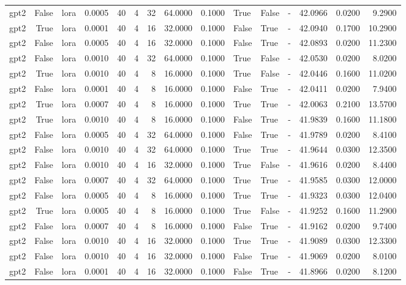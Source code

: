 \begin{tabular}{lrlrrrrrrlllrrr}
gpt2 & False & lora & 0.0005 & 40 & 4 & 32 & 64.0000 & 0.1000 & True & False & - & 42.0966 & 0.0200 & 9.2900 \\
gpt2 & True & lora & 0.0001 & 40 & 4 & 16 & 32.0000 & 0.1000 & False & True & - & 42.0940 & 0.1700 & 10.2900 \\
gpt2 & False & lora & 0.0005 & 40 & 4 & 16 & 32.0000 & 0.1000 & False & True & - & 42.0893 & 0.0200 & 11.2300 \\
gpt2 & False & lora & 0.0010 & 40 & 4 & 32 & 64.0000 & 0.1000 & True & False & - & 42.0530 & 0.0200 & 8.0200 \\
gpt2 & True & lora & 0.0010 & 40 & 4 & 8 & 16.0000 & 0.1000 & True & False & - & 42.0446 & 0.1600 & 11.0200 \\
gpt2 & False & lora & 0.0001 & 40 & 4 & 8 & 16.0000 & 0.1000 & False & True & - & 42.0411 & 0.0200 & 7.9400 \\
gpt2 & True & lora & 0.0007 & 40 & 4 & 8 & 16.0000 & 0.1000 & True & True & - & 42.0063 & 0.2100 & 13.5700 \\
gpt2 & True & lora & 0.0010 & 40 & 4 & 8 & 16.0000 & 0.1000 & False & True & - & 41.9839 & 0.1600 & 11.1800 \\
gpt2 & False & lora & 0.0005 & 40 & 4 & 32 & 64.0000 & 0.1000 & False & True & - & 41.9789 & 0.0200 & 8.4100 \\
gpt2 & False & lora & 0.0010 & 40 & 4 & 32 & 64.0000 & 0.1000 & True & True & - & 41.9644 & 0.0300 & 12.3500 \\
gpt2 & False & lora & 0.0010 & 40 & 4 & 16 & 32.0000 & 0.1000 & True & False & - & 41.9616 & 0.0200 & 8.4400 \\
gpt2 & False & lora & 0.0007 & 40 & 4 & 32 & 64.0000 & 0.1000 & True & True & - & 41.9585 & 0.0300 & 12.0000 \\
gpt2 & False & lora & 0.0005 & 40 & 4 & 8 & 16.0000 & 0.1000 & True & True & - & 41.9323 & 0.0300 & 12.0400 \\
gpt2 & True & lora & 0.0005 & 40 & 4 & 8 & 16.0000 & 0.1000 & True & False & - & 41.9252 & 0.1600 & 11.2900 \\
gpt2 & False & lora & 0.0007 & 40 & 4 & 8 & 16.0000 & 0.1000 & False & True & - & 41.9162 & 0.0200 & 9.7400 \\
gpt2 & False & lora & 0.0010 & 40 & 4 & 16 & 32.0000 & 0.1000 & True & True & - & 41.9089 & 0.0300 & 12.3300 \\
gpt2 & False & lora & 0.0010 & 40 & 4 & 16 & 32.0000 & 0.1000 & False & True & - & 41.9069 & 0.0200 & 8.0100 \\
gpt2 & False & lora & 0.0001 & 40 & 4 & 16 & 32.0000 & 0.1000 & False & True & - & 41.8966 & 0.0200 & 8.1200 \\

\end{tabular}
